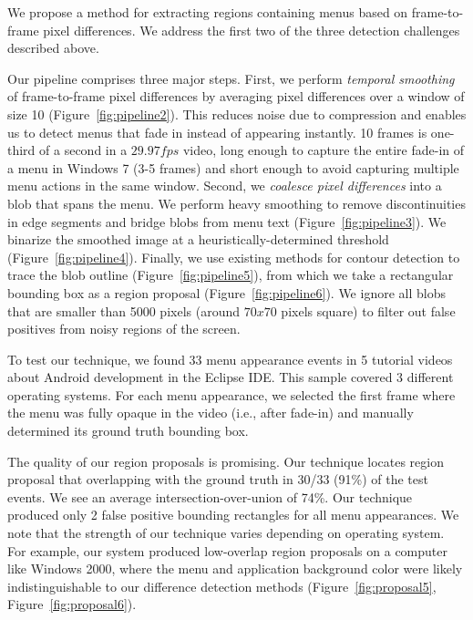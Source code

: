 \documentclass[10pt]{article}
\begin{document}
We propose a method for extracting regions containing menus based on frame-to-frame pixel
differences.  We address the first two of the three detection challenges described above.

Our pipeline comprises three major steps.  First, we perform \emph{temporal smoothing}
of frame-to-frame pixel differences by averaging pixel differences over a window of size 10 
(Figure~\ref{fig:pipeline2}).  This reduces noise due to compression and enables us to detect
menus that fade in instead of appearing instantly.  10 frames is one-third of a second in a $29.97fps$ video, 
long enough to capture the entire fade-in of a menu in Windows 7 (3-5 frames)
and short enough to avoid capturing multiple menu actions in the same window.  Second, we \emph{coalesce
pixel differences} into a blob that spans the menu.  We perform heavy smoothing to remove
discontinuities in edge segments and bridge blobs from menu text (Figure~\ref{fig:pipeline3}).
We binarize the smoothed image at a heuristically-determined threshold (Figure~\ref{fig:pipeline4}).
Finally, we use existing methods for contour detection to trace the blob outline (Figure~\ref{fig:pipeline5}),
from which we take a rectangular bounding box as a region proposal (Figure~\ref{fig:pipeline6}).
We ignore all blobs that are smaller than 5000 pixels (around $70x70$ pixels square) to filter
out false positives from noisy regions of the screen.

To test our technique, we found 33 menu appearance events in 5 tutorial videos about Android development
in the Eclipse IDE.  This sample covered 3 different operating systems.
For each menu appearance, we selected the first frame where the menu was fully opaque in the video
(i.e., after fade-in) and manually determined its ground truth bounding box.

The quality of our region proposals is promising.  Our technique locates region proposal that
overlapping with the ground truth in 30/33 (91\%) of the test events.  We see an average 
intersection-over-union of 74\%.  Our technique produced only 2 false positive bounding rectangles 
for all menu appearances.  We note that the strength of our technique varies depending
on operating system.  For example, our system produced low-overlap region proposals
on a computer like Windows 2000, where the menu and application background color were likely
indistinguishable to our difference detection methods (Figure~\ref{fig:proposal5}, Figure~\ref{fig:proposal6}).
\end{document}
